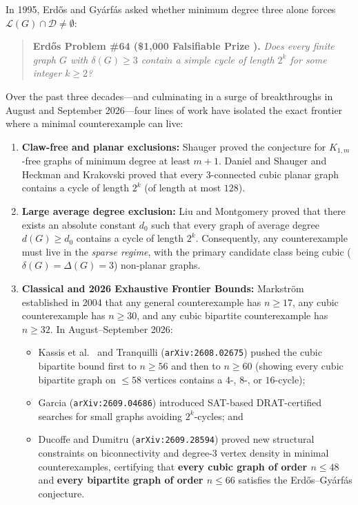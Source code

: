 \documentclass[10pt,a4paper]{article}
\theoremstyle{definition}
\theoremstyle{remark}
\begin{document}
In 1995, Erd\H{o}s and Gy\'arf\'as \cite{erdos1997some} asked whether minimum degree three alone forces $\mathcal{L}(G) \cap \mathcal{D} \ne \emptyset$:

\begin{quote}
\textbf{Erd\H{o}s Problem \#64 (\$1,000 Falsifiable Prize \cite{erdos1997some}).}
\emph{Does every finite graph $G$ with $\delta(G) \ge 3$ contain a simple cycle of length $2^k$ for some integer $k \ge 2$?}
\end{quote}

Over the past three decades---and culminating in a surge of breakthroughs in August and September 2026---four lines of work have isolated the exact frontier where a minimal counterexample can live:
\begin{enumerate}[nosep]
  \item \textbf{Claw-free and planar exclusions:} Shauger \cite{shauger1998results} proved the conjecture for $K_{1,m}$-free graphs of minimum degree at least $m+1$. Daniel and Shauger \cite{daniel2001erdos} and Heckman and Krakovski \cite{heckman2013erdos} proved that every 3-connected cubic planar graph contains a cycle of length $2^k$ (of length at most $128$).
  \item \textbf{Large average degree exclusion:} Liu and Montgomery \cite{liu2020solution} proved that there exists an absolute constant $d_0$ such that every graph of average degree $d(G) \ge d_0$ contains a cycle of length $2^k$. Consequently, any counterexample must live in the \emph{sparse regime}, with the primary candidate class being cubic ($\delta(G) = \Delta(G) = 3$) non-planar graphs.
  \item \textbf{Classical and 2026 Exhaustive Frontier Bounds:} Markstr\"om \cite{markstrom2004extremal} established in 2004 that any general counterexample has $n \ge 17$, any cubic counterexample has $n \ge 30$, and any cubic bipartite counterexample has $n \ge 32$. In August--September 2026:
  \begin{itemize}[nosep]
    \item Kassis et al.\ \cite{kassis2026bipartite} and Tranquilli \cite{tranquilli2026bipartite} (\texttt{arXiv:2608.02675}) pushed the cubic bipartite bound first to $n \ge 56$ and then to $n \ge 60$ (showing every cubic bipartite graph on $\le 58$ vertices contains a $4$-, $8$-, or $16$-cycle);
    \item Garcia \cite{garcia2026sat} (\texttt{arXiv:2609.04686}) introduced SAT-based DRAT-certified searches for small graphs avoiding $2^k$-cycles; and
    \item Ducoffe and Dumitru \cite{ducoffe2026structured} (\texttt{arXiv:2609.28594}) proved new structural constraints on biconnectivity and degree-3 vertex density in minimal counterexamples, certifying that \textbf{every cubic graph of order $n \le 48$} and \textbf{every bipartite graph of order $n \le 66$} satisfies the Erd\H{o}s--Gy\'arf\'as conjecture.
  \end{itemize}
\end{enumerate}
\end{document}

